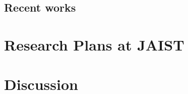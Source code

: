 \documentclass{article}
\begin{document}
\subsection{}
\subsection{Recent works}
\section{Research Plans at JAIST}
\label{sec:rpl}
\section{Discussion}
\label{sec:disc}

\printbibliography

\end{document}
